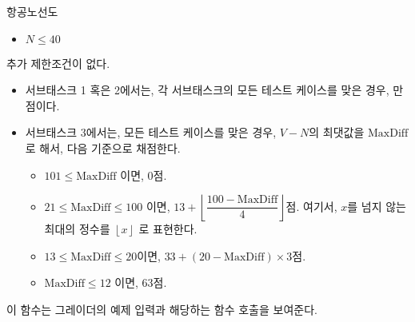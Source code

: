 \begin{problem}{항공노선도}
\begin{itemize}
	\item $N \le 40$
\end{itemize}


추가 제한조건이 없다.


\Scoring

\begin{itemize}
	\item 서브태스크 1 혹은 2에서는, 각 서브태스크의 모든 테스트 케이스를 맞은 경우, 만점이다.
	\item 서브태스크 3에서는, 모든 테스트 케이스를 맞은 경우, $V-N$의 최댓값을 $\textrm{MaxDiff}$로 해서, 다음 기준으로 채점한다.
	\begin{itemize}
		\item $101 \le \textrm{MaxDiff}$ 이면, 0점.
		\item $21 \le \textrm{MaxDiff} \le 100$ 이면, $13+\left\lfloor\dfrac{100-\textrm{MaxDiff}}{4}\right\rfloor$점. 여기서, $x$를 넘지 않는 최대의 정수를 $\left\lfloor x \right\rfloor$ 로 표현한다.
		\item $13 \le \textrm{MaxDiff} \le 20$이면, $33+(20-\textrm{MaxDiff}) \times 3$점.
		\item $\textrm{MaxDiff} \le 12$ 이면, 63점.
	\end{itemize}
\end{itemize}

\Examples

이 함수는 그레이더의 예제 입력과 해당하는 함수 호출을 보여준다.


\end{problem}
